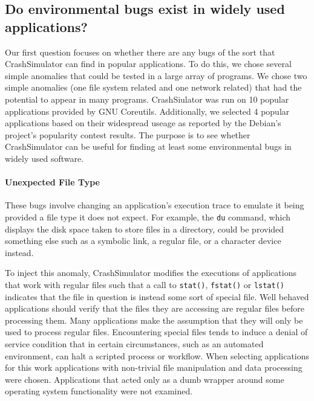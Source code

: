\subsection{Do environmental bugs  exist in widely used applications?}

Our first question focuses on whether there are any bugs of the sort that
CrashSimulator can find in popular applications.  To do this, we 
chose several simple anomalies that could be tested in a large
array of programs.  We chose two simple anomalies (one file system
related and one network related) that had the potential to appear in
many programs. CrashSiulator was run on 10 popular applications provided by GNU Coreutils.
Additionally, we selected 4 popular applications based on their widespread useage
as reported by the Debian's project's popularity contest results.
The purpose is to see whether CrashSimulator can be useful
for finding at least some environmental bugs in widely used software.


\paragraph{Unexpected File Type}
These bugs involve changing an application's execution trace to emulate it 
being provided a file type it does not expect.  For example, the {\tt du} 
command, which displays the disk space taken to store files in a directory, 
could be provided something else such as a symbolic link, a regular file, or
a character device instead.

To inject this anomaly, CrashSimulator
modifies the executions of applications that work with regular files such that
a call to
{\tt stat()}, {\tt fstat()} or {\tt lstat()} indicates that the file in question is instead some sort of special file.
Well behaved applications should verify that the files they are accessing are regular files before processing them.
Many applications make the assumption that they will only be used to process regular files.  Encountering
special files tends to induce a denial of service condition that in certain circumstances, such as an automated
environment, can halt a scripted process or workflow.
When selecting applications for this work applications with non-trivial file manipulation and data
processing were chosen.  Applications that acted only as a dumb wrapper around 
some operating system functionality were not examined.

